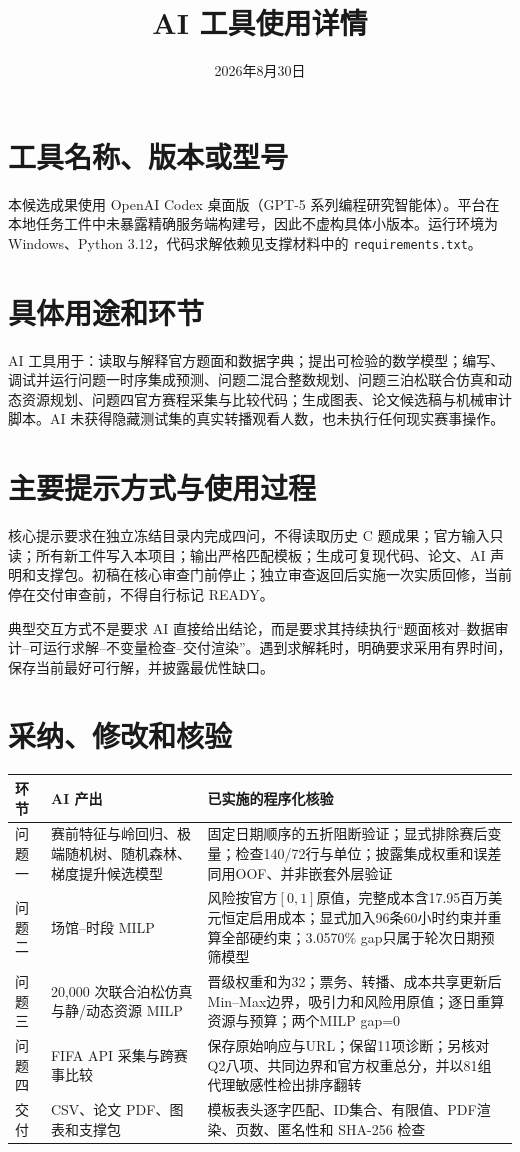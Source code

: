 \documentclass[UTF8,11pt,a4paper]{ctexart}
\title{AI 工具使用详情}
\author{}
\date{2026年8月30日}
\begin{document}
\pagestyle{plain}
\maketitle

\section{工具名称、版本或型号}
本候选成果使用 OpenAI Codex 桌面版（GPT-5 系列编程研究智能体）。平台在本地任务工件中未暴露精确服务端构建号，因此不虚构具体小版本。运行环境为 Windows、Python 3.12，代码求解依赖见支撑材料中的 \texttt{requirements.txt}。

\section{具体用途和环节}
AI 工具用于：读取与解释官方题面和数据字典；提出可检验的数学模型；编写、调试并运行问题一时序集成预测、问题二混合整数规划、问题三泊松联合仿真和动态资源规划、问题四官方赛程采集与比较代码；生成图表、论文候选稿与机械审计脚本。AI 未获得隐藏测试集的真实转播观看人数，也未执行任何现实赛事操作。

\section{主要提示方式与使用过程}
核心提示要求在独立冻结目录内完成四问，不得读取历史 C 题成果；官方输入只读；所有新工件写入本项目；输出严格匹配模板；生成可复现代码、论文、AI 声明和支撑包。初稿在核心审查门前停止；独立审查返回后实施一次实质回修，当前停在交付审查前，不得自行标记 READY。

典型交互方式不是要求 AI 直接给出结论，而是要求其持续执行“题面核对--数据审计--可运行求解--不变量检查--交付渲染”。遇到求解耗时，明确要求采用有界时间，保存当前最好可行解，并披露最优性缺口。

\section{采纳、修改和核验}
\begin{longtable}{p{2.7cm}p{5.3cm}p{5.3cm}}
\toprule
环节 & AI 产出 & 已实施的程序化核验\\
\midrule
问题一 & 赛前特征与岭回归、极端随机树、随机森林、梯度提升候选模型 & 固定日期顺序的五折阻断验证；显式排除赛后变量；检查140/72行与单位；披露集成权重和误差同用OOF、并非嵌套外层验证\\
问题二 & 场馆--时段 MILP & 风险按官方$[0,1]$原值，完整成本含17.95百万美元恒定启用成本；显式加入96条60小时约束并重算全部硬约束；3.0570\% gap只属于轮次日期预筛模型\\
问题三 & 20,000 次联合泊松仿真与静/动态资源 MILP & 晋级权重和为32；票务、转播、成本共享更新后Min--Max边界，吸引力和风险用原值；逐日重算资源与预算；两个MILP gap=0\\
问题四 & FIFA API 采集与跨赛事比较 & 保存原始响应与URL；保留11项诊断；另核对Q2八项、共同边界和官方权重总分，并以81组代理敏感性检出排序翻转\\
交付 & CSV、论文 PDF、图表和支撑包 & 模板表头逐字匹配、ID集合、有限值、PDF渲染、页数、匿名性和 SHA-256 检查\\
\bottomrule
\end{longtable}
\end{document}
